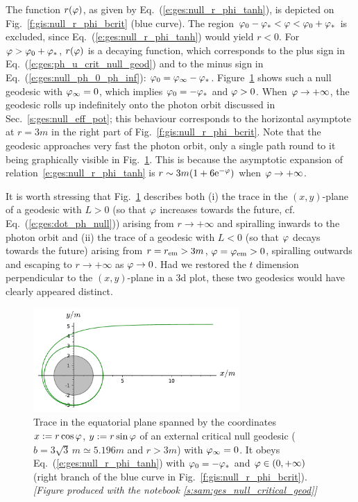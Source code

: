 The function $r(\varphi)$, as given by Eq.~(\ref{e:ges:null_r_phi_tanh}), is
depicted on Fig.~\ref{f:gis:null_r_phi_bcrit} (blue curve).
The region $\varphi_0-\varphi_* < \varphi < \varphi_0 + \varphi_*$ is excluded, since
Eq.~(\ref{e:ges:null_r_phi_tanh}) would yield $r<0$. For $\varphi > \varphi_0 + \varphi_*$,
$r(\varphi)$ is a decaying
function, which corresponds to the
plus sign in Eq.~(\ref{e:ges:ph_u_crit_null_geod}) and to the minus sign in
Eq.~(\ref{e:ges:null_ph_0_ph_inf}): $\varphi_0 = \varphi_\infty - \varphi_*$.
Figure~\ref{f:gis:null_b_crit_from_inf_L_pos} shows such a null geodesic with
$\varphi_\infty=0$, which implies $\varphi_0 = - \varphi_*$ and $\varphi>0$.
When $\varphi\to +\infty$, the geodesic rolls up indefinitely onto the photon
orbit discussed in Sec.~\ref{s:ges:null_eff_pot}; this
behaviour corresponds to the horizontal asymptote at $r=3m$ in
the right part of Fig.~\ref{f:gis:null_r_phi_bcrit}.
Note that the geodesic approaches very fast the photon orbit, only a single
path round to it being graphically visible in Fig.~\ref{f:gis:null_b_crit_from_inf_L_pos}.
This is because the asymptotic expansion of relation~\eqref{e:ges:null_r_phi_tanh} is
$r\sim 3m(1+ 6\mathrm{e}^{-\varphi})$ when $\varphi\to+\infty$.

It is worth stressing that Fig.~\ref{f:gis:null_b_crit_from_inf_L_pos} describes both (i) the trace
in the $(x,y)$-plane of a
geodesic with $L>0$ (so that $\varphi$ increases towards the future, cf. Eq.~(\ref{e:ges:dot_ph_null})) arising from $r\to + \infty$
and spiralling inwards to the photon orbit
and (ii) the trace of a geodesic with $L<0$ (so that $\varphi$ decays towards the future)
arising from $r=r_{\rm em} > 3 m$, $\varphi=\varphi_{\rm em}>0$,
spiralling outwards and escaping to $r\to +\infty$ as $\varphi\to 0$. Had we restored the
$t$ dimension perpendicular to the $(x,y)$-plane in a 3d plot, these two geodesics would have
clearly appeared distinct.

\begin{figure}
\centerline{\includegraphics[width=0.7\textwidth]{ges_null_b_crit_from_inf_L_pos.pdf}}
\caption[]{\label{f:gis:null_b_crit_from_inf_L_pos} \footnotesize
Trace in the equatorial plane spanned by the coordinates $x:=r\cos\varphi$, $y:=r\sin\varphi$
of an external critical null geodesic ($b = 3\sqrt{3} \, m \simeq 5.196 m$ and
$r>3m$) with $\varphi_\infty=0$.
It obeys Eq.~(\ref{e:ges:null_r_phi_tanh}) with $\varphi_0 = -\varphi_*$ and $\varphi\in(0,+\infty)$
(right branch of the blue curve in Fig.~\ref{f:gis:null_r_phi_bcrit}).
\textsl{[Figure produced with the notebook \ref{s:sam:ges_null_critical_geod}]}
}
\end{figure}

